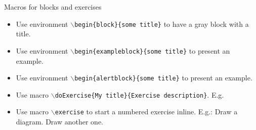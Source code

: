 \documentclass[aspectratio=169]{beamer}
\begin{document}
\begin{slide}{Macros for blocks and exercises}
	\begin{itemize}
    \item Use environment \alert{\texttt{$\backslash$begin\{block\}\{some title\}}} to have a gray block with a title.

    \item Use environment \alert{\texttt{$\backslash$begin\{exampleblock\}\{some title\}}} to present an example.

    \item Use environment \alert{\texttt{$\backslash$begin\{alertblock\}\{some title\}}} to present an example.

    \item Use macro \alert{\texttt{$\backslash$doExercise\{My title\}\{Exercise description\}}}.
    E.g.

    \item Use macro \alert{\texttt{$\backslash$exercise}} to start a numbered exercise inline.
    E.g.: \exercise Draw a diagram. \exercise Draw another one.

  \end{itemize}
  
\end{slide}
\end{document}
